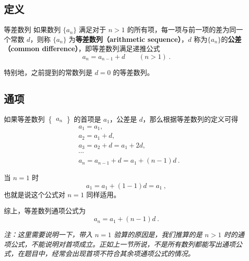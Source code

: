 
\begin{issues}
\issueDraft
\end{issues}


\subsection{定义}

\begin{definition}{等差数列}
如果数列 $\{a_n\}$ 满足对于 $n > 1$ 的所有项，每一项与前一项的差为同一个常数 $d$，则称 $\{a_n\}$ 为\textbf{等差数列（arithmetic sequence）}，$d$ 称为$\{a_n\}$的\textbf{公差（common difference）}，即等差数列满足递推公式
\begin{equation}
a_{n}=a_{n-1}+d\qquad(n>1)~.
\end{equation}
\end{definition}

特别地，之前提到的常数列是 $d = 0$ 的等差数列。

\subsection{通项}
如果等差数列 $\begin{Bmatrix} a_n \end{Bmatrix}$ 的首项是 $a_1$，公差是 $d$，那么根据等差数列的定义可得
\begin{equation}
\begin{aligned}
&a_1 = a_1,\\
&a_2 = a_1 + d,\\
&a_3 = a_2 + d = a_1 + 2d,\\
&\cdots \\
&a_n = a_{n-1} + d = a_1 + (n - 1)d~.
\end{aligned}
\end{equation}

当 $n = 1$ 时
\begin{equation}
a_1 = a_1 + (1 - 1)d = a_1~,
\end{equation}
也就是说这个公式对 $n = 1$ 同样适用。

综上，等差数列通项公式为
\begin{equation}
a_n = a_1 + (n - 1)d~.
\end{equation}

\textsl{注：这里需要说明一下，带入 $n = 1$ 验算的原因是，我们推算的是 $n > 1$ 时的通项公式，不能说明对首项成立。正如上一节所说，不是所有数列都能写出通项公式，在题目中，经常会出现首项不符合其余项通项公式的情况。}

